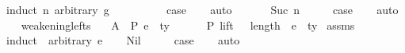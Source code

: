 \begin{isabellebody}
%
\isadelimproof
%
\endisadelimproof
%
\isatagproof
{}\isamarkupfalse%
\ {\isacharparenleft}{\kern0pt}induct\ n\ arbitrary{\isacharcolon}{\kern0pt}\ g{\isacharparenright}{\kern0pt}\isanewline
\ \ \isamarkupfalse%
\ {}\isanewline
\ \ \isamarkupfalse%
\ \isamarkupfalse%
\ {\isacharquery}{\kern0pt}case\isanewline
\ \ \isamarkupfalse%
\ auto\isanewline
\ \ \isamarkupfalse%
\isanewline
{}\isamarkupfalse%
\isanewline
\ \ \isamarkupfalse%
\ {\isacharparenleft}{\kern0pt}Suc\ n{\isacharparenright}{\kern0pt}\isanewline
\ \ \isamarkupfalse%
\ \isamarkupfalse%
\ {\isacharquery}{\kern0pt}case\isanewline
\ \ \isamarkupfalse%
\ auto\isanewline
\ \ \isamarkupfalse%
\isanewline
{}\isamarkupfalse%
%
\endisatagproof
{\isafoldproof}%
%
\isadelimproof
\isanewline
%
\endisadelimproof
\isanewline
\isanewline
{}\isamarkupfalse%
\ weakening{\isacharunderscore}{\kern0pt}lefts{}{\isacharcolon}{\kern0pt}\isanewline
\ \ \ A{}{\isacharcolon}{\kern0pt}\ {\isachardoublequoteopen}{\isasymGamma}\ {\isasymturnstile}{\isacharbraceleft}{\kern0pt}P{\isacharbraceright}{\kern0pt}\ e\ {\isacharcolon}{\kern0pt}\ ty{\isachardoublequoteclose}\isanewline
\ \ \ {\isachardoublequoteopen}{\isasymGamma}{}\ {\isacharat}{\kern0pt}\ {\isasymGamma}\ {\isasymturnstile}{\isacharbraceleft}{\kern0pt}P{\isacharbraceright}{\kern0pt}\ {\isacharparenleft}{\kern0pt}lift\ {}\ {\isacharcircum}{\kern0pt}{\isacharcircum}{\kern0pt}\ length\ {\isasymGamma}{}{\isacharparenright}{\kern0pt}\ e\ {\isacharcolon}{\kern0pt}\ ty{\isachardoublequoteclose}\isanewline
%
\isadelimproof
%
\endisadelimproof
%
\isatagproof
{}\isamarkupfalse%
\ assms\isanewline
{}\isamarkupfalse%
\ {\isacharparenleft}{\kern0pt}induct\ {\isasymGamma}{}\ arbitrary{\isacharcolon}{\kern0pt}\ e{\isacharparenright}{\kern0pt}\isanewline
\ \ \isamarkupfalse%
\ Nil\isanewline
\ \ \isamarkupfalse%
\ \isamarkupfalse%
\ {\isacharquery}{\kern0pt}case\isanewline
\ \ \isamarkupfalse%
\ auto\isanewline
\ \ \isamarkupfalse%
\isanewline
{}\isamarkupfalse%
\isanewline
\ \ \isamarkupfalse%

\end{isabellebody}

